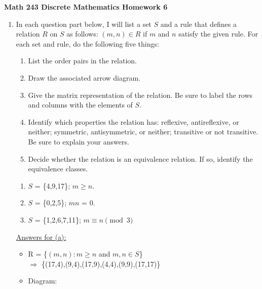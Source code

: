 \documentclass{article}
\begin{document}
\noindent\textbf{Math 243 Discrete Mathematics \hfill Homework 6}

\begin{enumerate}
    \item In each question part below, I will list a set $\mathit{S}$ and 
    a rule that defines a relation $\mathit{R}$ on $\mathit{S}$ as follows: 
    $(\mathit{m,n}) \in R$ if $\mathit{m}$ and $\mathit{n}$ satisfy the given rule. 
    For each set and rule, do the following five things: 
\begin{enumerate}[label=\bfseries \roman*]
\item List the order pairs in the relation.
\item Draw the associated arrow diagram.
\item Give the matrix representation of the relation. 
Be sure to label the rows and columns with the elements of $S$.
\item Identify which properties the relation has: reflexive, 
antireflexive, or neither; symmetric, antisymmetric, or neither; 
transitive or not transitive. Be sure to explain your answers.
\item Decide whether the relation is an equivalence relation. 
If so, identify the equivalence classes.     
\end{enumerate}

\begin{enumerate}
    \item $\mathit{S}$ = \{4,9,17\}; $m \geq n$.    
    \item $\mathit{S}$ = \{0,2,5\}; $mn$ = 0.
    \item $\mathit{S}$ = \{1,2,6,7,11\}; $m \equiv n \pmod{3}$
\end{enumerate}

\small
\underline{Answers for (a):}    

\begin{itemize}
    \item R = \{$(m,n):m \geq n$ and $m,n \in S$\}
    \\$\Rightarrow$ \{(17,4),(9,4),(17,9),(4,4),(9,9),(17,17)\}\\

    \item Diagram:\\
\end{itemize}
\end{enumerate}
\end{document}
